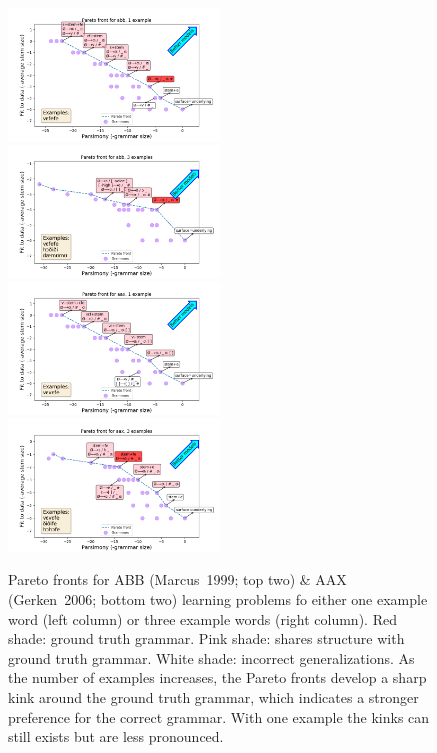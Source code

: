 \documentclass{article}
\begin{document}
\begin{figure}[H]

\includegraphics[width = 0.5\textwidth]{abb1.png} \includegraphics[width = 0.5\textwidth]{abb3.png}
\includegraphics[width = 0.5\textwidth]{aax1.png} \includegraphics[width = 0.5\textwidth]{aax3.png}
  
  \caption{Pareto fronts for ABB  (Marcus~1999; top two) \& AAX  (Gerken~2006; bottom two) learning problems fo either one example word (left column) or three example words  (right column). {\color{red}Red shade}: ground truth grammar. {\color{red!60}Pink shade}: shares structure with ground truth grammar. White shade: incorrect generalizations. As the number of examples increases, the Pareto fronts develop a sharp kink around the ground truth grammar, which indicates a stronger preference for the correct grammar. With one example the kinks can still exists but are less pronounced.}\label{quadrupleFrontier}
\end{figure}
\end{document}

